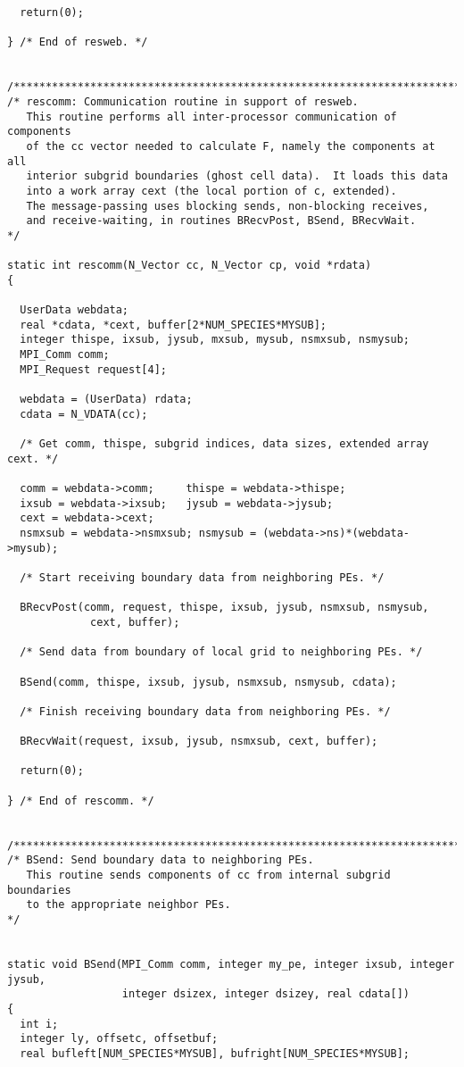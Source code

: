 \documentclass[11pt]{article}
\begin{document}
\begin{verbatim}
  return(0);
 
} /* End of resweb. */


/*************************************************************************/
/* rescomm: Communication routine in support of resweb.
   This routine performs all inter-processor communication of components
   of the cc vector needed to calculate F, namely the components at all
   interior subgrid boundaries (ghost cell data).  It loads this data
   into a work array cext (the local portion of c, extended).
   The message-passing uses blocking sends, non-blocking receives,
   and receive-waiting, in routines BRecvPost, BSend, BRecvWait.         */

static int rescomm(N_Vector cc, N_Vector cp, void *rdata)
{

  UserData webdata;
  real *cdata, *cext, buffer[2*NUM_SPECIES*MYSUB];
  integer thispe, ixsub, jysub, mxsub, mysub, nsmxsub, nsmysub;
  MPI_Comm comm;
  MPI_Request request[4];

  webdata = (UserData) rdata;
  cdata = N_VDATA(cc);

  /* Get comm, thispe, subgrid indices, data sizes, extended array cext. */

  comm = webdata->comm;     thispe = webdata->thispe;
  ixsub = webdata->ixsub;   jysub = webdata->jysub;
  cext = webdata->cext;
  nsmxsub = webdata->nsmxsub; nsmysub = (webdata->ns)*(webdata->mysub);

  /* Start receiving boundary data from neighboring PEs. */

  BRecvPost(comm, request, thispe, ixsub, jysub, nsmxsub, nsmysub, 
             cext, buffer);

  /* Send data from boundary of local grid to neighboring PEs. */

  BSend(comm, thispe, ixsub, jysub, nsmxsub, nsmysub, cdata);

  /* Finish receiving boundary data from neighboring PEs. */

  BRecvWait(request, ixsub, jysub, nsmxsub, cext, buffer);

  return(0);

} /* End of rescomm. */


/*************************************************************************/
/* BSend: Send boundary data to neighboring PEs.
   This routine sends components of cc from internal subgrid boundaries
   to the appropriate neighbor PEs.                                      */
 

static void BSend(MPI_Comm comm, integer my_pe, integer ixsub, integer jysub,
                  integer dsizex, integer dsizey, real cdata[])
{
  int i;
  integer ly, offsetc, offsetbuf;
  real bufleft[NUM_SPECIES*MYSUB], bufright[NUM_SPECIES*MYSUB];


\end{verbatim}
\end{document}
